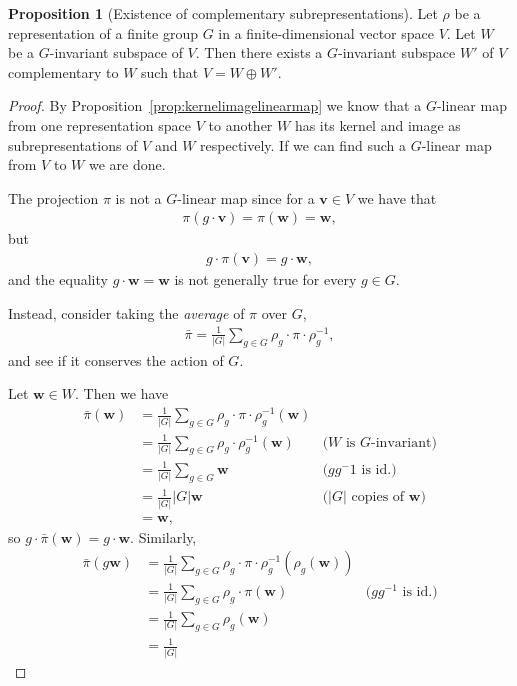 \documentclass[12pt, a4paper, twoside]{article}
\theoremstyle{definition}
\newtheorem{proposition}[definition]{Proposition}
\theoremstyle{remark}
\numberwithin{equation}{section}
\newcommand{\1}{\mathbf{1}}
\newcommand{\0}{\mathbf{0}}
\newcommand{\vvec}{\mathbf{v}}
\newcommand{\wvec}{\mathbf{w}}
\newcommand{\barpi}{\bar{\pi}}
\begin{document}
	\begin{proposition}[Existence of complementary subrepresentations]
		Let $\rho$ be a representation of a finite group $G$ in a finite-dimensional vector space $V$. Let $W$ be a $G$-invariant subspace of $V$. Then there exists a $G$-invariant subspace $W'$ of $V$ complementary to $W$ such that $V = W \oplus W'$.
	\end{proposition}
	\begin{proof}
		By Proposition~\ref{prop:kernelimagelinearmap} we know that a $G$-linear map from one representation space $V$ to another $W$ has its kernel and image as subrepresentations of $V$ and $W$ respectively. If we can find such a $G$-linear map from $V$ to $W$ we are done.
		
		The projection $\pi$ is not a $G$-linear map since for a $\vvec \in V$ we have that 
		\begin{align*}
			\pi(g \cdot \vvec) = \pi(\wvec) = \wvec,
		\end{align*}
		but 
		\begin{align*}
			g \cdot \pi(\vvec) = g \cdot \wvec,
		\end{align*}
		and the equality $g \cdot \wvec = \wvec$ is not generally true for every $g \in G$.
		
		Instead, consider taking the \textit{average} of $\pi$ over $G$,
		\begin{align*}
			\barpi = \frac{1}{|G|} \sum_{g \in G} \rho_g \cdot \pi \cdot \rho_g^{-1},
		\end{align*}
		and see if it conserves the action of $G$.
		
		Let $\wvec \in W$. Then we have 
		\begin{align*}
			\barpi(\wvec) &= \frac{1}{|G|} \sum_{g \in G} \rho_g \cdot \pi \cdot \rho_g^{-1} (\wvec) \\
			&= \frac{1}{|G|} \sum_{g \in G} \rho_g \cdot \rho_g^{-1} (\wvec) & \text{($W$ is  $G$-invariant)} \\
			&= \frac{1}{|G|} \sum_{g \in G} \wvec & \text{($gg^-1$ is id.)}\\
			&= \frac{1}{|G|} |G|\wvec & \text{($|G|$ copies of $\wvec$)}\\
			& = \wvec,
		\end{align*}
		so $g \cdot \barpi (\wvec) = g \cdot \wvec$. Similarly,
		\begin{align*}
			\barpi(g \wvec) &= \frac{1}{|G|} \sum_{g \in G} \rho_g \cdot \pi \cdot \rho_g^{-1} (\rho_g(\wvec)) \\
			&= \frac{1}{|G|} \sum_{g \in G} \rho_g \cdot \pi (\wvec) & \text{($gg^{-1}$ is id.)}\\
			&= \frac{1}{|G|} \sum_{g \in G} \rho_g (\wvec) \\
			&= \frac{1}{|G|}
		\end{align*}
		

\end{proof}
\end{document}
